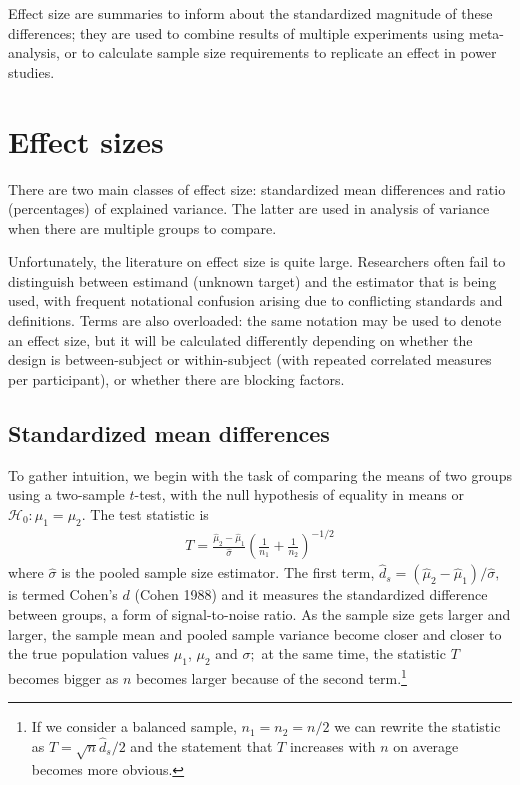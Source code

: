 \documentclass[
  11pt,
  letterpaper,
]{scrbook}
\theoremstyle{definition}
\theoremstyle{definition}
\theoremstyle{remark}
\begin{document}
Effect size are summaries to inform about the standardized magnitude of
these differences; they are used to combine results of multiple
experiments using meta-analysis, or to calculate sample size
requirements to replicate an effect in power studies.

\section{Effect sizes}\label{effect-sizes}

There are two main classes of effect size: standardized mean differences
and ratio (percentages) of explained variance. The latter are used in
analysis of variance when there are multiple groups to compare.

Unfortunately, the literature on effect size is quite large. Researchers
often fail to distinguish between estimand (unknown target) and the
estimator that is being used, with frequent notational confusion arising
due to conflicting standards and definitions. Terms are also overloaded:
the same notation may be used to denote an effect size, but it will be
calculated differently depending on whether the design is
between-subject or within-subject (with repeated correlated measures per
participant), or whether there are blocking factors.

\subsection{Standardized mean
differences}\label{standardized-mean-differences}

To gather intuition, we begin with the task of comparing the means of
two groups using a two-sample \(t\)-test, with the null hypothesis of
equality in means or \(\mathscr{H}_0: \mu_1 = \mu_2\). The test
statistic is \begin{align*}
T =  \frac{\widehat{\mu}_2 - \widehat{\mu}_1}{\widehat{\sigma}} \left(\frac{1}{n_1}+\frac{1}{n_2}\right)^{-1/2}
\end{align*} where \(\widehat{\sigma}\) is the pooled sample size
estimator. The first term,
\(\widehat{d}_s = (\widehat{\mu}_2 - \widehat{\mu}_1)/\widehat{\sigma},\)
is termed Cohen's \(d\) (Cohen 1988) and it measures the standardized
difference between groups, a form of signal-to-noise ratio. As the
sample size gets larger and larger, the sample mean and pooled sample
variance become closer and closer to the true population values
\(\mu_1\), \(\mu_2\) and \(\sigma;\) at the same time, the statistic
\(T\) becomes bigger as \(n\) becomes larger because of the second
term.\footnote{If we consider a balanced sample, \(n_1 = n_2 = n/2\) we
  can rewrite the statistic as \(T = \sqrt{n} \widehat{d}_s/2\) and the
  statement that \(T\) increases with \(n\) on average becomes more
  obvious.}
\end{document}
